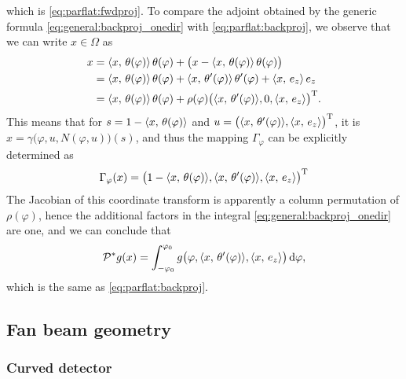 \documentclass{amsart}
\renewcommand*{\phi}{\varphi}
\begin{document}
%
which is \eqref{eq:parflat:fwdproj}. To compare the adjoint obtained by the generic formula \eqref{eq:general:backproj_onedir} with 
\eqref{eq:parflat:backproj}, we observe that we can write $x \in \Omega$ as
%
\begin{align*}
 x 
 &= \INNER{x}{\theta(\phi)}\, \theta(\phi) + \big(x - \INNER{x}{\theta(\phi)}\, \theta(\phi)\big) \\
 &= \INNER{x}{\theta(\phi)}\, \theta(\phi) + \INNER{x}{\theta'(\phi)}\, \theta'(\phi) + \INNER{x}{e_z}\, e_z \\
 &= \INNER{x}{\theta(\phi)}\, \theta(\phi) + \rho(\phi) \TRANSP{\big(\INNER{x}{\theta'(\phi)}, 0, \INNER{x}{e_z}\big)}.
\end{align*}
%
This means that for $s = 1 - \INNER{x}{\theta(\phi)}$ and $u = \TRANSP{\big(\INNER{x}{\theta'(\phi)}, \INNER{x}{e_z}\big)}$, it is 
$x = \gamma\big(\phi, u, N(\phi, u)\big)(s)$, and thus the mapping $\Gamma_\phi$ can be explicitly determined as
%
\begin{equation*}
 \Gamma_\phi(x) = \TRANSP{\big(1 - \INNER{x}{\theta(\phi)}, \INNER{x}{\theta'(\phi)}, \INNER{x}{e_z}\big)}
\end{equation*}
%
The Jacobian of this coordinate transform is apparently a column permutation of $\rho(\phi)$, hence the additional factors in the integral 
\eqref{eq:general:backproj_onedir} are one, and we can conclude that
%
\begin{equation*}
 \DUALOPP g(x) = \int_{-\phi_0}^{\phi_0} g\big(\phi, \INNER{x}{\theta'(\phi)}, \INNER{x}{e_z}\big)\, \D\phi,
\end{equation*}
%
which is the same as \eqref{eq:parflat:backproj}.%
\vspace{5ex}%



\subsection{Fan beam geometry}
\label{sec:applications:fanbeam}

\subsubsection{Curved detector}
\label{sec:applications:fanbeam:curved}
\end{document}
